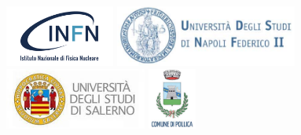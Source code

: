 \documentclass[12pt]{article}
\begin{document}
\includegraphics[height=2cm]{figures/logo1.jpeg}\;
\includegraphics[height=2cm]{figures/logo2.png}\;
\includegraphics[height=2cm]{figures/logo3.jpeg}\;
\includegraphics[height=2cm]{figures/logo4.png}

\end{document}
